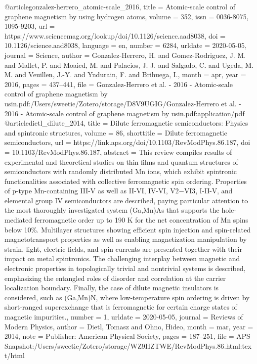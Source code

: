 {@article{gonzalez-herrero_atomic-scale_2016,
	title = {Atomic-scale control of graphene magnetism by using hydrogen atoms},
	volume = {352},
	issn = {0036-8075, 1095-9203},
	url = {https://www.sciencemag.org/lookup/doi/10.1126/science.aad8038},
	doi = {10.1126/science.aad8038},
	language = {en},
	number = {6284},
	urldate = {2020-05-05},
	journal = {Science},
	author = {Gonzalez-Herrero, H. and Gomez-Rodriguez, J. M. and Mallet, P. and Moaied, M. and Palacios, J. J. and Salgado, C. and Ugeda, M. M. and Veuillen, J.-Y. and Yndurain, F. and Brihuega, I.},
	month = apr,
	year = {2016},
	pages = {437--441},
	file = {Gonzalez-Herrero et al. - 2016 - Atomic-scale control of graphene magnetism by usin.pdf:/Users/sweetie/Zotero/storage/D8V9UGIG/Gonzalez-Herrero et al. - 2016 - Atomic-scale control of graphene magnetism by usin.pdf:application/pdf}
}
@article{dietl_dilute_2014,
	title = {Dilute ferromagnetic semiconductors: {Physics} and spintronic structures},
	volume = {86},
	shorttitle = {Dilute ferromagnetic semiconductors},
	url = {https://link.aps.org/doi/10.1103/RevModPhys.86.187},
	doi = {10.1103/RevModPhys.86.187},
	abstract = {This review compiles results of experimental and theoretical studies on thin films and quantum structures of semiconductors with randomly distributed Mn ions, which exhibit spintronic functionalities associated with collective ferromagnetic spin ordering. Properties of p-type Mn-containing III-V as well as II-VI, IV-VI, V2−VI3, I-II-V, and elemental group IV semiconductors are described, paying particular attention to the most thoroughly investigated system (Ga,Mn)As that supports the hole-mediated ferromagnetic order up to 190 K for the net concentration of Mn spins below 10\%. Multilayer structures showing efficient spin injection and spin-related magnetotransport properties as well as enabling magnetization manipulation by strain, light, electric fields, and spin currents are presented together with their impact on metal spintronics. The challenging interplay between magnetic and electronic properties in topologically trivial and nontrivial systems is described, emphasizing the entangled roles of disorder and correlation at the carrier localization boundary. Finally, the case of dilute magnetic insulators is considered, such as (Ga,Mn)N, where low-temperature spin ordering is driven by short-ranged superexchange that is ferromagnetic for certain charge states of magnetic impurities.},
	number = {1},
	urldate = {2020-05-05},
	journal = {Reviews of Modern Physics},
	author = {Dietl, Tomasz and Ohno, Hideo},
	month = mar,
	year = {2014},
	note = {Publisher: American Physical Society},
	pages = {187--251},
	file = {APS Snapshot:/Users/sweetie/Zotero/storage/WZ9HZTWE/RevModPhys.86.html:text/html}
}

}
